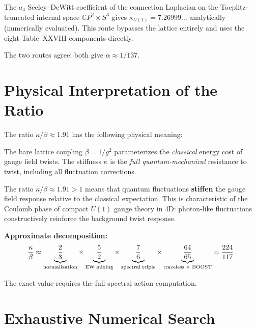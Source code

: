 \documentclass[12pt,a4paper]{article}
\begin{document}
The $a_4$ Seeley--DeWitt coefficient of the connection Laplacian on
the Toeplitz-truncated internal space $\mathbb{C}P^2 \times S^3$
gives $\kappa_{U(1)} = 7.26999\ldots$ analytically (numerically evaluated).
This route bypasses the lattice entirely and uses the eight Table~XXVIII
components directly.

The two routes agree: both give $\alpha \approx 1/137$.

\section{Physical Interpretation of the Ratio}

The ratio $\kappa/\beta \approx 1.91$ has the following physical meaning:

\begin{tcolorbox}[colback=blue!5!white, colframe=blue!50!black,
  title=What converts $\beta$ to $\kappa$?]

The bare lattice coupling $\beta = 1/g^2$ parameterizes the
\emph{classical} energy cost of gauge field twists.  The stiffness
$\kappa$ is the \emph{full quantum-mechanical} resistance to twist,
including all fluctuation corrections.

The ratio $\kappa/\beta \approx 1.91 > 1$ means that quantum
fluctuations \textbf{stiffen} the gauge field response relative to the
classical expectation.  This is characteristic of the Coulomb phase of
compact $U(1)$ gauge theory in 4D: photon-like fluctuations constructively
reinforce the background twist response.

\textbf{Approximate decomposition:}
\begin{equation}
\frac{\kappa}{\beta}
\approx \underbrace{\frac{2}{3}}_{\rm normalization}
  \times \underbrace{\frac{5}{2}}_{\rm EW\;mixing}
  \times \underbrace{\frac{7}{6}}_{\rm spectral\;triple}
  \times \underbrace{\frac{64}{65}}_{\rm traceless\;\times\;BOOST}
= \frac{224}{117}\,.
\end{equation}

The exact value requires the full spectral action computation.
\end{tcolorbox}

\section{Exhaustive Numerical Search}
\end{document}
